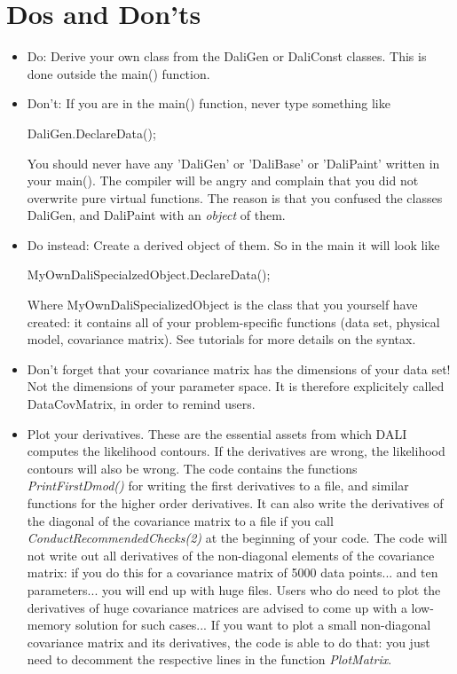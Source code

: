 \documentclass[12pt,twoside]{extarticle}
\newenvironment{file}{\begin{fBox}}{\hfill{\color{dalifile}}\end{fBox}}
\begin{document}
\section{Dos and Don'ts}
\begin{itemize}
\item Do: Derive your own class from the DaliGen or DaliConst classes.
This is done outside the main() function.
\item Don't: If you are in the main() function, never type something
like\\
\begin{file}
 DaliGen.DeclareData();\\
\end{file}
You should never have any 'DaliGen' or 'DaliBase' or 'DaliPaint' written in your main(). The compiler will be angry and complain that you did not overwrite pure virtual functions. The reason is that you confused the classes DaliGen, and DaliPaint with an \emph{object} of them.
\item Do instead: Create a derived object of them. So in the main it will look like\\
\begin{file}
 MyOwnDaliSpecialzedObject.DeclareData();\\
\end{file}
Where MyOwnDaliSpecializedObject is the class that you yourself have created:
it contains all of your problem-specific functions (data set, physical
model, covariance matrix). See tutorials for more details on the syntax.
\item Don't forget that your covariance matrix has the dimensions of
your data set! Not the dimensions of your parameter space. It is
therefore explicitely called DataCovMatrix, in order to remind users.
\item Plot your derivatives. These are the essential assets from which DALI computes the likelihood contours. If the derivatives are wrong, the likelihood contours will also be wrong. The code contains the functions \emph{PrintFirstDmod()} for writing the first derivatives to a file, and similar functions for the higher order derivatives. It can also write the derivatives of the diagonal of the covariance matrix to a file if you call \emph{ConductRecommendedChecks(2)} at the beginning of your code. The code will not write out all derivatives of the non-diagonal elements of the covariance matrix: if you do this for a covariance matrix of 5000 data points... and ten parameters... you will end up with huge files. Users who do need to plot the derivatives of huge covariance matrices are advised to come up with a low-memory solution for such cases... 
If you want to plot a small non-diagonal covariance matrix and its derivatives, the code is able to do that: you just need to decomment the respective lines in the function \emph{PlotMatrix}.
\end{itemize}
\end{document}
